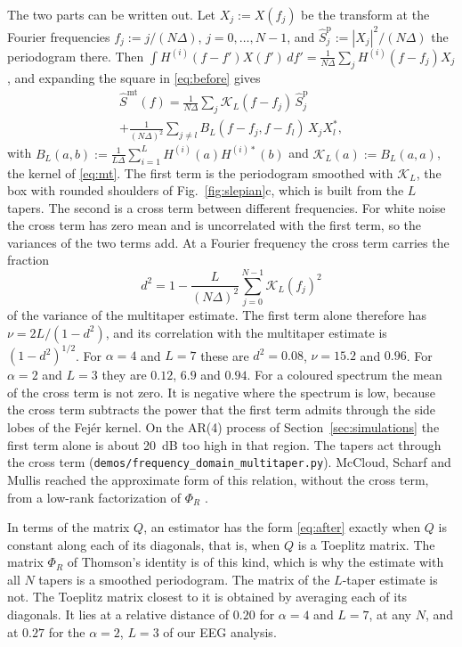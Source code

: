 \documentclass[10pt,twocolumn]{article}
\newcommand{\dd}{\,d}
\begin{document}
The two parts can be written out. Let $X_j:=X(f_j)$ be the transform at the Fourier frequencies $f_j:=j/(N\Delta)$, $j=0,\dots,N-1$, and $\hat S^{\mathrm p}_j:=|X_j|^2/(N\Delta)$ the periodogram there. Then $\int H^{(i)}(f-f')X(f')\dd f'=\frac{1}{N\Delta}\sum_jH^{(i)}(f-f_j)X_j$, and expanding the square in \eqref{eq:before} gives
\begin{multline}
\hat S^{\mathrm{mt}}(f)=\frac{1}{N\Delta}\sum_{j}\mathcal{K}_L(f-f_j)\,\hat S^{\mathrm p}_j\\
+\frac{1}{(N\Delta)^2}\sum_{j\neq l}B_L(f-f_j,f-f_l)\,X_jX_l^{*},
\label{eq:split}
\end{multline}
with $B_L(a,b):=\frac{1}{L\Delta}\sum_{i=1}^LH^{(i)}(a)H^{(i)*}(b)$ and $\mathcal{K}_L(a):=B_L(a,a)$, the kernel of \eqref{eq:mt}. The first term is the periodogram smoothed with $\mathcal{K}_L$, the box with rounded shoulders of Fig.~\ref{fig:slepian}c, which is built from the $L$ tapers. The second is a cross term between different frequencies. For white noise the cross term has zero mean and is uncorrelated with the first term, so the variances of the two terms add. At a Fourier frequency the cross term carries the fraction
\begin{equation}
d^2=1-\frac{L}{(N\Delta)^2}\sum_{j=0}^{N-1}\mathcal{K}_L(f_j)^2
\label{eq:share}
\end{equation}
of the variance of the multitaper estimate. The first term alone therefore has $\nu=2L/(1-d^2)$, and its correlation with the multitaper estimate is $(1-d^2)^{1/2}$. For $\alpha=4$ and $L=7$ these are $d^2=0.08$, $\nu=15.2$ and $0.96$. For $\alpha=2$ and $L=3$ they are $0.12$, $6.9$ and $0.94$. For a coloured spectrum the mean of the cross term is not zero. It is negative where the spectrum is low, because the cross term subtracts the power that the first term admits through the side lobes of the Fej\'er kernel. On the AR(4) process of Section~\ref{sec:simulations} the first term alone is about 20~dB too high in that region. The tapers act through the cross term (\texttt{demos/frequency\_domain\_multitaper.py}). McCloud, Scharf and Mullis reached the approximate form of this relation, without the cross term, from a low-rank factorization of $\Phi_R$ \cite{mccloud1999}.

In terms of the matrix $Q$, an estimator has the form \eqref{eq:after} exactly when $Q$ is constant along each of its diagonals, that is, when $Q$ is a Toeplitz matrix. The matrix $\Phi_R$ of Thomson's identity is of this kind, which is why the estimate with all $N$ tapers is a smoothed periodogram. The matrix of the $L$-taper estimate is not. The Toeplitz matrix closest to it is obtained by averaging each of its diagonals. It lies at a relative distance of $0.20$ for $\alpha=4$ and $L=7$, at any $N$, and at $0.27$ for the $\alpha=2$, $L=3$ of our EEG analysis.
\end{document}
